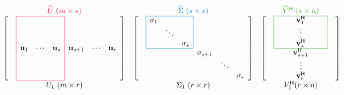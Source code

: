 \begin{align*} %
\begin{array}{cccc}
\textcolor{red}{\widehat{U}\ (m \times s)} & \textcolor{blue}{\widehat{\Sigma}\ (s \times s)} & \textcolor{green}{\widehat{V}\hrm\ (s \times n)} \\
\left[\begin{array}{ccccccc}
\arrayrulecolor{red}
\cline{2-4}
& \lvl{}     &        & \rvl{}     &          &        &      \\
& \lvl{}     &        & \rvl{}     &          &        &      \\
& \lvl{}     &        & \rvl{}     &          &        &      \\
& \lvl{\u_1} & \cdots & \rvl{\u_s} & \u_{s+1} & \cdots & \u_r \\
& \lvl{}     &        & \rvl{}     &          &        &      \\
& \lvl{}     &        & \rvl{}     &          &        &      \\
& \lvl{}     &        & \rvl{}     &          &        &      \\
\cline{2-4}
\end{array}\right]
&
\left[\begin{array}{cccccccc}
\arrayrulecolor{blue}
\cline{2-4}
& \lvl{\sigma_{1}}  &   & \rvl{}         &   &        &   \\
& \lvl{}       & \ddots & \rvl{}         &   &        &   \\
& \lvl{}       &        & \rvl{\sigma_{s}} & &        &   \\
\cline{2-4}
&              &        &                & \sigma_{s+1} &        &   \\
&              &        &                &   & \ddots &   \\
&              &        &                &   &        & \sigma_r \\
\end{array}\right]
&
\left[\begin{array}{ccccccc}
\arrayrulecolor{green}
\cline{2-6}
& \lvl{} & & \v\hrm_1 & & \rvl{} & \\
& \lvl{} & & \vdots   & & \rvl{} & \\
& \lvl{} & & \v\hrm_s & & \rvl{} & \\
\cline{2-6}
& & & \v\hrm_{s+1} & & & \\
& & & \vdots       & & & \\
& & & \v\hrm_r     & & & \\
\end{array}\right]
\\
U_1\ (m \times r) & \Sigma_1\ (r \times r) & V\hrm_1 (r \times n) \\
\end{array}
\end{align*}

